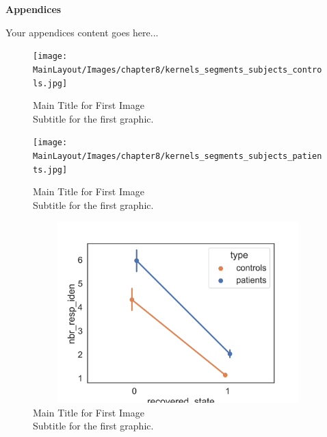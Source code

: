 \par\noindent\textbf{\huge{\color{blue}Appendices}}

\vspace{3cm}

Your appendices content goes here...

\begin{figure}[H]
    \centering
    \texttt{[image: MainLayout/Images/chapter8/kernels\_segments\_subjects\_controls.jpg]}
    \caption{Main Title for First Image \\ \small Subtitle for the first graphic.}
    \label{fig:kernels_segments_subjects_controls}
\end{figure}

\begin{figure}[H]
    \centering
    \texttt{[image: MainLayout/Images/chapter8/kernels\_segments\_subjects\_patients.jpg]}
    \caption{Main Title for First Image \\ \small Subtitle for the first graphic.}
    \label{fig:kernels_segments_subjects_patients}
\end{figure}

\begin{figure}[H]
    \centering
    \includegraphics[width=12cm,height=7cm]{MainLayout/Images/chapter9/nbr_resp_iden.jpg}
    \caption{Main Title for First Image \\ \small Subtitle for the first graphic.}
    \label{fig:nbr_resp_iden}
\end{figure}
\vspace{1cm}

\newpage
\thispagestyle{empty} %
\hspace{1cm} %

\newpage